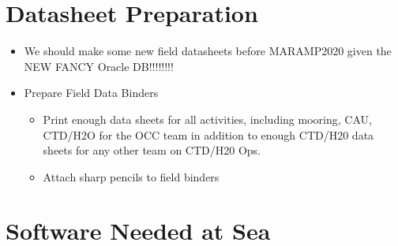 \documentclass[
]{book}
\providecommand{\tightlist}{%
  \setlength{\itemsep}{0pt}\setlength{\parskip}{0pt}}
\begin{document}
\hypertarget{datasheet-preparation}{%
\section{Datasheet Preparation}\label{datasheet-preparation}}

\begin{itemize}
\item
  We should make some new field datasheets before MARAMP2020 given the NEW FANCY Oracle DB!!!!!!!!
\item
  Prepare Field Data Binders

  \begin{itemize}
  \tightlist
  \item
    Print enough data sheets for all activities, including mooring, CAU, CTD/H2O for the OCC team in addition to enough CTD/H20 data sheets for any other team on CTD/H20 Ops.
  \item
    Attach sharp pencils to field binders
  \end{itemize}
\end{itemize}

\hypertarget{software-needed-at-sea}{%
\section{Software Needed at Sea}\label{software-needed-at-sea}}
\end{document}
